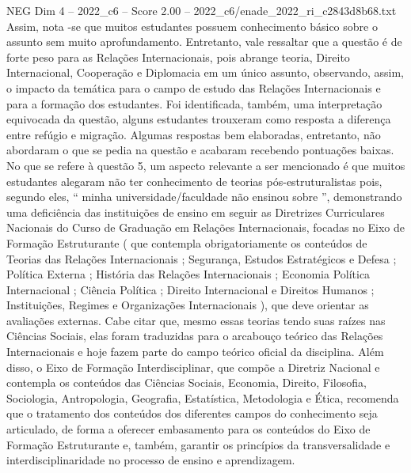 \begin{textsample}{NEG Dim 4 – 2022\_c6 – Score 2.00 – 2022\_c6/enade\_2022\_ri\_c2843d8b68.txt}
Assim, nota -se que muitos estudantes possuem conhecimento básico sobre o assunto sem muito aprofundamento.
Entretanto, vale ressaltar que a questão é de forte peso para as Relações Internacionais, pois abrange teoria, Direito Internacional, Cooperação e Diplomacia em um único assunto, observando, assim, o impacto da temática para o campo de estudo das Relações Internacionais e para a formação dos estudantes.
Foi identificada, também, uma interpretação equivocada da questão, alguns estudantes trouxeram como resposta a diferença entre refúgio e migração.
Algumas respostas bem elaboradas, entretanto, não abordaram o que se pedia na questão e acabaram recebendo pontuações baixas.
No que se refere à questão 5, um aspecto relevante a ser mencionado é que muitos estudantes alegaram não ter conhecimento de teorias pós-estruturalistas pois, segundo eles, “ minha universidade/faculdade não ensinou sobre ”, demonstrando uma deficiência das instituições de ensino em seguir as Diretrizes Curriculares Nacionais do Curso de Graduação em Relações Internacionais, focadas no Eixo de Formação Estruturante ( que contempla obrigatoriamente os conteúdos de Teorias das Relações Internacionais ; Segurança, Estudos Estratégicos e Defesa ; Política Externa ; História das Relações Internacionais ; Economia Política Internacional ; Ciência Política ; Direito Internacional e Direitos Humanos ; Instituições, Regimes e Organizações Internacionais ), que deve orientar as avaliações externas.
Cabe citar que, mesmo essas teorias tendo suas raízes nas Ciências Sociais, elas foram traduzidas para o arcabouço teórico das Relações Internacionais e hoje fazem parte do campo teórico oficial da disciplina.
Além disso, o Eixo de Formação Interdisciplinar, que compõe a Diretriz Nacional e contempla os conteúdos das Ciências Sociais, Economia, Direito, Filosofia, Sociologia, Antropologia, Geografia, Estatística, Metodologia e Ética, recomenda que o tratamento dos conteúdos dos diferentes campos do conhecimento seja articulado, de forma a oferecer embasamento para os conteúdos do Eixo de Formação Estruturante e, também, garantir os princípios da transversalidade e interdisciplinaridade no processo de ensino e aprendizagem.

\end{textsample}
